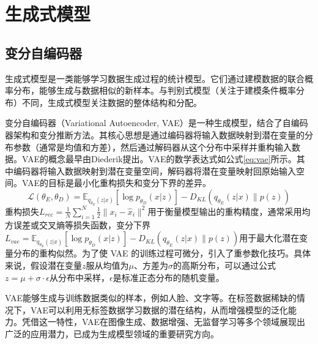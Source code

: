 \section{生成式模型}
\subsection{变分自编码器}
生成式模型是一类能够学习数据生成过程的统计模型。它们通过建模数据的联合概率分布，能够生成与数据相似的新样本。与判别式模型（关注于建模条件概率分布）不同，生成式模型关注数据的整体结构和分配。

变分自编码器（Variational Autoencoder, VAE）是一种生成模型，结合了自编码器架构和变分推断方法。其核心思想是通过编码器将输入数据映射到潜在变量的分布参数（通常是均值和方差），然后通过解码器从这个分布中采样并重构输入数据。VAE的概念最早由Diederik提出。VAE的数学表达式如公式\eqref{eq:vae}所示。其中编码器将输入数据映射到潜在变量空间，解码器将潜在变量映射回原始输入空间。VAE的目标是最小化重构损失和变分下界的差异\cite{kingma2013auto}。
\begin{equation}
  \mathcal{L}(\theta_E, \theta_D) = \mathbb{E}_{q_{\theta_E}(z|x)} \left[ \log p_{\theta_D}(x|z) \right] - D_{KL}(q_{\theta_E}(z|x) \| p(z)) \label{eq:vae}
\end{equation}
重构损失$L_{rec} = \frac{1}{N} \sum_{i=1}^{N} \frac{1}{2} \| x_i - \hat{x}_i \|^2$用于衡量模型输出的重构精度，通常采用均方误差或交叉熵等损失函数，变分下界$L_{vae} = \mathbb{E}_{q_{\theta_E}(z|x)} \left[ \log p_{\theta_D}(x|z) \right] - D_{KL}(q_{\theta_E}(z|x) \| p(z))
$用于最大化潜在变量分布的重构似然。为了使 VAE 的训练过程可微分，引入了重参数化技巧。具体来说，假设潜在变量$z$服从均值为$\mu$、方差为$\sigma$的高斯分布，可以通过公式$z = \mu + \sigma \cdot \epsilon$从分布中采样，$\epsilon$是标准正态分布的随机变量。

VAE能够生成与训练数据类似的样本，例如人脸、文字等。在标签数据稀缺的情况下，VAE可以利用无标签数据学习数据的潜在结构，从而增强模型的泛化能力。凭借这一特性，VAE在图像生成、数据增强、无监督学习等多个领域展现出广泛的应用潜力，已成为生成模型领域的重要研究方向。
